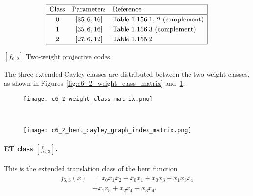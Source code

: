 \documentclass[12pt,a4paper]{article}
\begin{document}
\begin{table}[!bhpt] %
\small{
\begin{align*}
\def\arraystretch{1.2}
\begin{array}{|ccl|}
\hline
\text{Class} &
\text{Parameters} & \text{Reference}
\\
\hline
0 & [35,6,16] & \text{Table 1.156 1, 2 (complement)}
\\
1 & [35,6,16] & \text{Table 1.156 3 (complement)}
\\
2 & [27,6,12] & \text{Table 1.155 2 }
\\
\hline
\end{array}
\end{align*}
}
\caption{$[f_{6,2}]$ Two-weight projective codes.}
\label{tab-c6_2_codes}
\end{table}

The three extended Cayley classes are distributed between the two weight classes,
as shown in Figures~\ref{fig:c6_2_weight_class_matrix} and~\ref{fig:c6_2_bent_cayley_graph_index_matrix}.

\begin{figure}[!bhpt] %
\centering
\begin{minipage}{.48\textwidth}
  \centering
  \texttt{[image: c6\_2\_weight\_class\_matrix.png]}
  \label{fig:c6_2_weight_class_matrix}
\end{minipage}%
~~~~
\begin{minipage}{.48\textwidth}
  \centering
  \texttt{[image: c6\_2\_bent\_cayley\_graph\_index\_matrix.png]}
  \label{fig:c6_2_bent_cayley_graph_index_matrix}
\end{minipage}
\end{figure}

%
\paragraph*{ET class $[f_{6,3}]$.}
%
This is the extended translation class of the bent function
\begin{align*}
f_{6,3}(x) &= x_{0} x_{1} x_{2} + x_{0} x_{1} + x_{0} x_{3} + x_{1} x_{3} x_{4}
\\
           &+ x_{1} x_{5} + x_{2} x_{4} + x_{3} x_{4}.
\end{align*}
\end{document}
